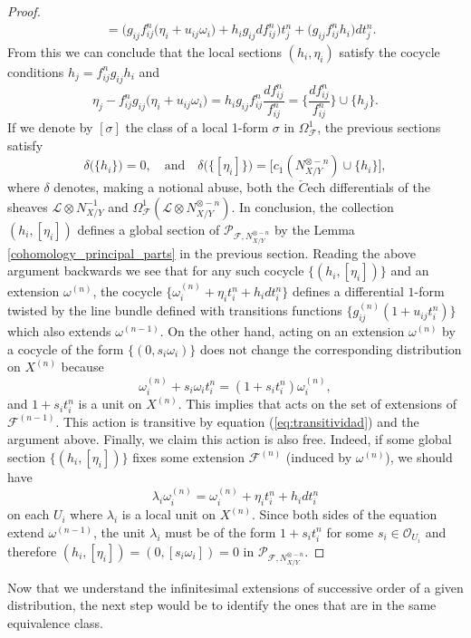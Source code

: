 \documentclass[reqno]{amsart}
\theoremstyle{plain}
\newcommand{\OO}{\mathcal{O}}
\renewcommand{\L}{\mathcal{L}}
\newcommand{\F}{\mathscr{F}}
\newcommand{\PP}{\mathcal{P}}
\theoremstyle{definition}
\theoremstyle{named}
\begin{document}
\begin{proof}
\begin{align*}
     &= \Big(
     g_{ij} f_{ij}^n\big(\eta_i+u_{ij}\omega_i\big)+h_i g_{ij} df_{ij}^n\Big)t_j^n + \Big(g_{ij} f_{ij}^nh_i\Big)dt_j^n.
\end{align*}
From this we can conclude that the local sections $(h_i,\eta_i)$ satisfy the cocycle conditions $h_j = f_{ij}^ng_{ij}h_i$ and 
\[ 
\eta_j - f_{ij}^ng_{ij}\big(\eta_i+u_{ij}\omega_i\big) = h_i g_{ij} f_{ij}^n\frac{d f_{ij}^n}{f_{ij}^n} = \bigg\{\frac{d f_{ij}^n}{f_{ij}^n}\bigg\}\cup \{h_j\}.
\]
If we denote by $[\sigma]$ the class of a local 1-form $\sigma$ in $\Omega^1_{\F}$, the previous sections satisfy 
\[
\delta\big(\{h_i\}\big) = 0,\quad\text{and}\quad\delta\big(\{[\eta_i]\}\big) = \big[c_1(N_{X/Y}^{\otimes - n})\cup\{h_i\}\big], 
\]
where $\delta$ denotes, making a notional abuse, both the $\check{C}$ech differentials of the sheaves $\L\otimes N_{X/Y}^{-1}$ and $\Omega^{1}_\F(\L\otimes N_{X/Y}^{\otimes - n})$. In conclusion, the collection ${(h_i,[\eta_i])}$ defines a global section of $\PP_{\F,N_{X/Y}^{\otimes - n}}$ by the Lemma \ref{cohomology_principal_parts} in the previous section. Reading the above argument backwards we see that for any such cocycle $\{(h_i,[\eta_i])\}$ and an extension $\omega^{(n)}$, the cocycle $\big\{\omega_i^{(n)}+\eta_it_i^n + h_i dt_i^n\big\}$ defines a differential $1$-form twisted by the line bundle defined with transitions functions $\big\{g_{ij}^{(n)}(1+u_{ij}t_i^n)\big\}$ which also extends $\omega^{(n-1)}$. On the other hand, acting on an extension $\omega^{(n)}$ by a cocycle of the form $\{(0,s_i\omega_i)\}$ does not change the corresponding distribution on $X^{(n)}$ because 
\[
\omega_i^{(n)}+s_i\omega_it_i^n = (1+s_it_i^n)\omega_i^{(n)},
\]
and $1+s_it_i^n$ is a unit on $X^{(n)}$. This implies that \smash{$H^0\big(X,\PP_{\F,N_{X/Y}^{\otimes - n}}\big)$} acts on the set of extensions of $\F^{(n-1)}$. This action is transitive by equation (\ref{eq:transitividad}) and the argument above. Finally, we claim this action is also free. Indeed, if some global section $\{(h_i,[\eta_i])\}$ fixes some extension $\F^{(n)}$ (induced by $\omega^{(n)}$), we should have 
$$\lambda_i\omega_i^{(n)} = \omega_i^{(n)}+\eta_it_i^n + h_i dt_i^n$$
on each $U_i$ where $\lambda_i$ is a local unit on $X^{(n)}$. Since both sides of the equation extend $\omega^{(n-1)}$, the unit $\lambda_i$ must be of the form $1+s_it_i^{n}$ for some $s_i\in \OO_{U_i}$ 
 and therefore $(h_i,[\eta_i]) = (0,[s_i\omega_i])= 0$ in $\PP_{\F,N_{X/Y}^{\otimes - n}}$.
\end{proof}

Now that we understand the infinitesimal extensions of successive order of a given distribution, the next step would be to identify the ones that are in the same equivalence class.
\end{document}
